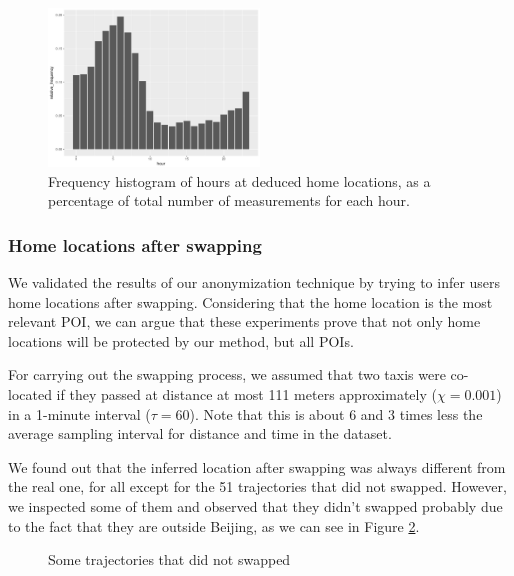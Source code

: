 \documentclass{llncs}
\begin{document}
\begin{figure}
\center
  \includegraphics[width=0.5\textwidth]{figures/HomeHour}
\caption{Frequency histogram of hours at deduced home locations, as a percentage of total number of measurements for each hour.}
  \label{fig:homehours}
\end{figure}

\subsubsection{Home locations after swapping}
We validated the results of our anonymization technique by trying to infer users home locations after swapping. 
Considering that the home location is the most relevant POI, we can argue that these experiments prove that not only home locations will be protected by our method, but all POIs.

For carrying out the swapping process, we assumed that two taxis were co-located if they passed at distance at most 111 meters approximately ($\chi= 0.001$) in a 1-minute interval ($\tau = 60$). Note that this is about 6 and 3 times less the average sampling interval for distance and time in the dataset.

We found out that the inferred location after swapping was always different from the real one, for all except for the 51 trajectories that did not swapped.
However, we inspected some of them and observed that they didn't swapped probably due to the fact that they are outside Beijing, as we can see in Figure \ref{fig:noSwap}.

\begin{figure}
  \caption{Some trajectories that did not swapped}
  \label{fig:noSwap}
\end{figure}
\end{document}
